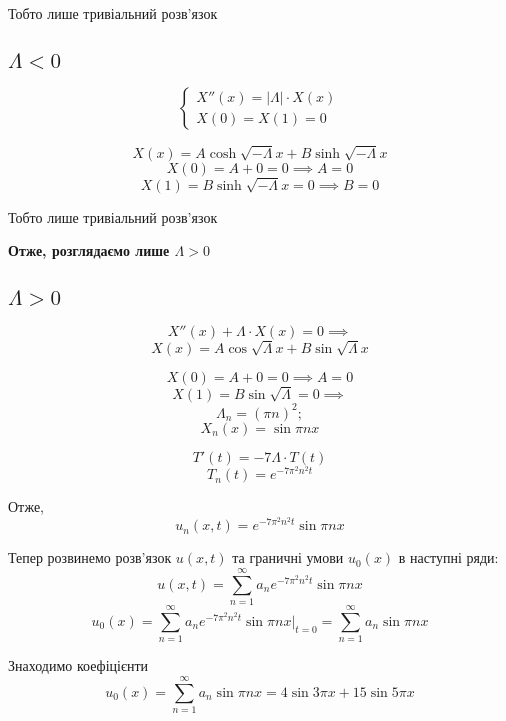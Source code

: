 \documentclass[11pt, a4paper]{article} %
\begin{document}
Тобто лише тривіальний розв'язок

\subsection*{$\Lambda<0$}

$$
    \begin{cases}
        X''(x) = |\Lambda| \cdot X(x)\\
        X(0) = X(1) = 0
    \end{cases}
$$

$$X(x) = A \cosh \sqrt{-\Lambda}x + B \sinh \sqrt{-\Lambda}x$$
$$X(0) = A + 0 = 0 \implies A = 0$$
$$X(1) = B \sinh \sqrt{-\Lambda}x = 0 \implies B = 0$$

Тобто лише тривіальний розв'язок

\textbf{Отже, розглядаємо лише $\Lambda > 0$}

\subsection*{$\Lambda > 0$}

$$X''(x) + \Lambda \cdot X(x) = 0 \implies$$
\begin{equation}
    X(x) = A \cos \sqrt{\Lambda}x + B \sin \sqrt{\Lambda}x
\end{equation}

$$X(0) = A + 0 = 0 \implies A = 0$$
$$X(1) = B \sin \sqrt{\Lambda} = 0 \implies$$
\begin{equation}
    \Lambda_n = (\pi n)^2;
\end{equation}
\begin{equation}
    X_n(x) = \sin \pi n x
\end{equation}

$$T'(t) = - 7 \Lambda \cdot T(t)$$
\begin{equation}
    T_n(t) = e^{-7\pi^2 n^2 t}
\end{equation}

Отже,
\begin{equation}
    u_n(x,t) = e^{-7\pi^2 n^2 t} \sin \pi n x
\end{equation}

Тепер розвинемо розв'язок $u(x,t)$ та граничні умови $u_0(x)$ в наступні ряди:
$$u(x,t) = \sum_{n=1}^\infty a_n e^{-7\pi^2 n^2 t} \sin \pi n x$$
$$u_0(x) = \sum_{n=1}^\infty a_n e^{-7\pi^2 n^2 t} \sin \pi n x |_{t=0} = \sum_{n=1}^\infty a_n \sin \pi n x$$

Знаходимо коефіцієнти
$$u_0(x) = \sum_{n=1}^\infty a_n \sin \pi n x = 4\sin 3\pi x + 15 \sin 5\pi x$$
\end{document}
